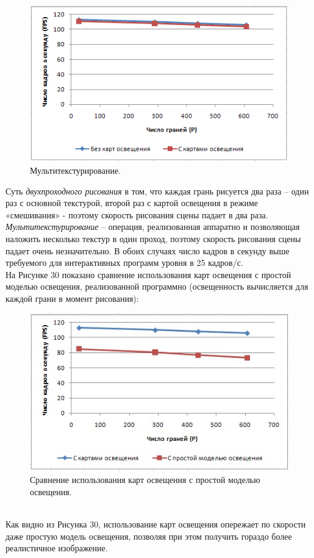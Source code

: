 \documentclass[a4paper, 10pt]{article}
\begin{document}
	\begin{figure}[h]
		\centering \includegraphics[scale=1]{chart4}
		\centering\caption{Мультитекстурирование.}
	\end{figure}
	\hspace*{5mm} Суть \textit{двухпроходного рисования} в том, что каждая грань рисуется два раза – один раз с основной текстурой, второй раз с картой освещения в режиме «смешивания» - поэтому скорость рисования сцены падает в два раза. \textit{Мультитекстурирование} – операция, реализованная аппаратно и позволяющая наложить несколько текстур в один проход, поэтому скорость рисования сцены падает очень незначительно. В обоих случаях число кадров в секунду выше требуемого для интерактивных программ уровня в 25 кадров/с.
	\\ \hspace*{5mm}На Рисунке 30 показано сравнение использования карт освещения с простой моделью освещения, реализованной программно (освещенность вычисляется для каждой грани в момент рисования):
	\begin{figure}[h]
		\centering \includegraphics[scale=1]{chart5}
		\centering\caption{Сравнение использования карт освещения с простой моделью освещения.}
	\end{figure}
	\\ \hspace*{5mm} Как видно из Рисунка 30, использование карт освещения опережает по скорости даже простую модель освещения, позволяя при этом получить гораздо более реалистичное изображение.
\end{document}
